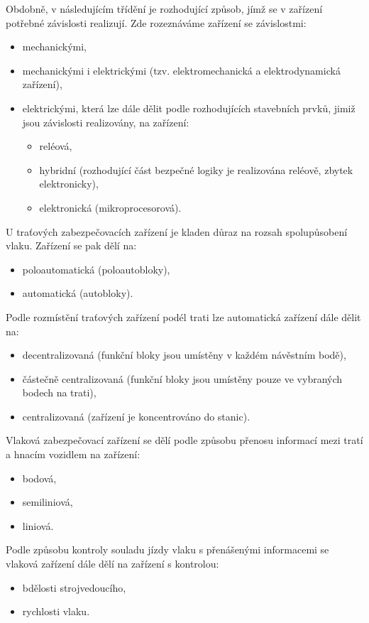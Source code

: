   Obdobně, v následujícím třídění je rozhodující způsob, jímž se v zařízení potřebné závislosti
  realizují. Zde rozeznáváme zařízení se závislostmi:
  \begin{itemize}
    \item mechanickými,
    \item mechanickými i elektrickými (tzv. elektromechanická a elektrodynamická zařízení),
    \item elektrickými, která lze dále dělit podle rozhodujících stavebních prvků, jimiž jsou 
         závislosti realizovány, na zařízení:
       \begin{itemize}
       \item reléová,
       \item hybridní (rozhodující část bezpečné logiky je realizována reléově, zbytek 
             elektronicky),
       \item elektronická (mikroprocesorová). 
       \end{itemize}
  \end{itemize}

  U traťových zabezpečovacích zařízení je kladen důraz na rozsah spolupůsobení vlaku. Zařízení se
  pak dělí na:
  \begin{itemize}
    \item poloautomatická (poloautobloky),
    \item automatická (autobloky).
  \end{itemize}
  Podle rozmístění traťových zařízení podél trati lze automatická zařízení dále dělit na:
  \begin{itemize}
    \item decentralizovaná (funkční bloky jsou umístěny v každém návěstním bodě),
    \item částečně centralizovaná (funkční bloky jsou umístěny pouze ve vybraných bodech na trati),
    \item centralizovaná (zařízení je koncentrováno do stanic).
  \end{itemize}
  Vlaková zabezpečovací zařízení se dělí podle způsobu přenosu informací mezi tratí a hnacím
  vozidlem na zařízení:
  \begin{itemize}
    \item bodová,
    \item semiliniová,
    \item liniová. 
  \end{itemize}

  Podle způsobu kontroly souladu jízdy vlaku s přenášenými informacemi se vlaková zařízení dále 
  dělí na zařízení s kontrolou:
  \begin{itemize}
    \item bdělosti strojvedoucího,
    \item rychlosti vlaku.
  \end{itemize}
  
